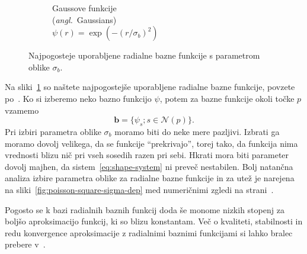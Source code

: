\documentclass[12pt,a4paper,twoside]{article}
\theoremstyle{definition} %
\theoremstyle{plain} %
\numberwithin{equation}{section}
\newcommand{\Nc}{\mathcal{N}}
\renewcommand{\b}{\boldsymbol}
\newcommand{\ang}[1]{(\hspace{-1.5px}\textit{angl.}\ #1)}
\begin{document}
\begin{figure}[h]
\begin{subfigure}[t]{0.32\textwidth}
    \caption[Gaussove funkcije]{Gaussove funkcije \\ \ang{Gaussians} \\ $\psi(r) = \exp(-(r/\sigma_b)^2)$}
  \end{subfigure}
  \caption[Najpogosteje uporabljene radialne bazne funkcije]{Najpogosteje uporabljene radialne bazne
  funkcije s parametrom oblike $\sigma_b$.}
  \label{fig:rbf}
\end{figure}



Na sliki~\ref{fig:rbf} so naštete najpogostejše uporabljene radialne bazne funkcije, povzete
po~\cite[str.\ 5]{schaback1995error}.
Ko si izberemo neko bazno funkcijo $\psi$, potem za bazne funkcije okoli točke
$p$ vzamemo
\begin{equation}
   \b b = \{\psi_s; s \in \Nc(p) \}.
\end{equation}
Pri izbiri parametra oblike $\sigma_b$ moramo biti do neke mere pazljivi. Izbrati
ga moramo dovolj velikega, da se funkcije ``prekrivajo'', torej tako, da funkcija
nima vrednosti blizu nič pri vseh sosedih razen pri sebi. Hkrati mora biti
parameter dovolj majhen, da sistem~\eqref{eq:shape-system} ni preveč nestabilen.
Bolj natančna analiza izbire parametra oblike za radialne bazne funkcije in
za utež je narejena na sliki~\ref{fig:poisson-square-sigma-dep} med numeričnimi
zgledi na strani~\pageref{fig:poisson-square-sigma-dep}.

Pogosto se k bazi radialnih baznih funkcij doda še monome nizkih stopenj za
boljšo aproksimacijo funkcij, ki so blizu konstantam. Več o kvaliteti,
stabilnosti in redu konvergence aproksimacije z radialnimi baznimi funkcijami
si lahko bralec prebere v~\cite{buhmann2000radial}.
\end{document}
